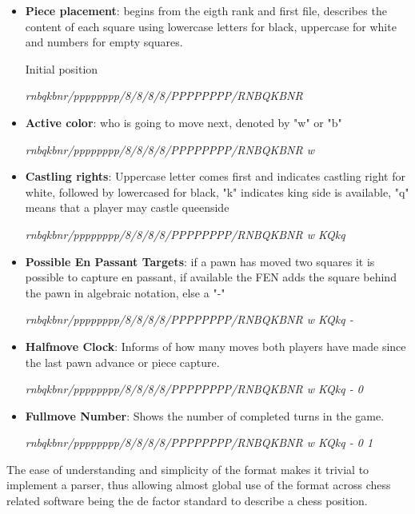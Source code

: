 \begin{itemize}
    \item {
        \textbf{Piece placement}: begins from the eigth rank and first file, describes the content of each square using lowercase letters for black, uppercase for white and numbers for empty squares.
        \begin{center}Initial position\end{center}
        \begin{center}
        \textit{rnbqkbnr/pppppppp/8/8/8/8/PPPPPPPP/RNBQKBNR}                    
        \end{center}
    }
    \item {
        \textbf{Active color}: who is going to move next, denoted by "w" or "b"
        \begin{center}
        \textit{rnbqkbnr/pppppppp/8/8/8/8/PPPPPPPP/RNBQKBNR w}                    
        \end{center}
    }
    \item {
        \textbf{Castling rights}: Uppercase letter comes first and indicates castling right for white, followed by lowercased for black, "k" indicates king side is available, "q" means that a player may castle queenside
        \begin{center}
        \textit{rnbqkbnr/pppppppp/8/8/8/8/PPPPPPPP/RNBQKBNR w KQkq}                    
        \end{center}
    }
    \item {
        \textbf{Possible En Passant Targets}: if a pawn has moved two squares it is possible to capture en passant, if available the FEN adds the square behind the pawn in algebraic notation, else a "-"
        \begin{center}
        \textit{rnbqkbnr/pppppppp/8/8/8/8/PPPPPPPP/RNBQKBNR w KQkq -}                    
        \end{center}
    }
    \item {
        \textbf{Halfmove Clock}: Informs of how many moves both players have made since the last pawn advance or piece capture.
        \begin{center}
        \textit{rnbqkbnr/pppppppp/8/8/8/8/PPPPPPPP/RNBQKBNR w KQkq - 0}                    
        \end{center}
    }
    \item {
        \textbf{Fullmove Number}: Shows the number of completed turns in the game.
        \begin{center}
        \textit{rnbqkbnr/pppppppp/8/8/8/8/PPPPPPPP/RNBQKBNR w KQkq - 0 1}                    
        \end{center}
    }
\end{itemize}
The ease of understanding and simplicity of the format makes it trivial to implement a parser, 
thus allowing almost global use of the format across chess related software being the de factor standard to describe a chess position.


